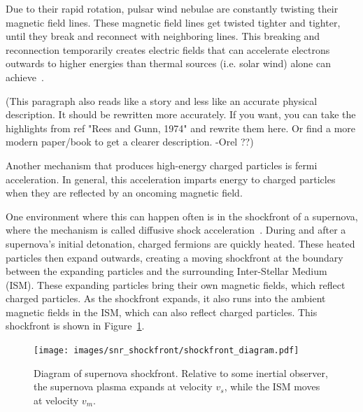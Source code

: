   \FloatBarrier
  
  
  Due to their rapid rotation, pulsar wind nebulae are constantly twisting their magnetic field lines.
  These magnetic field lines get twisted tighter and tighter, until they break and reconnect with neighboring lines.
  This breaking and reconnection temporarily creates electric fields that can accelerate electrons outwards to higher energies than thermal sources (i.e. solar wind) alone can achieve~\cite{gamma_pwn1,gamma_pwn2}.

  {\color{red}(This paragraph also reads like a story and less like an accurate physical description. It should be rewritten more accurately. If you want, you can take the highlights from ref "Rees and Gunn, 1974" and rewrite them here. Or find a more modern paper/book to get a clearer description. -Orel ??)}

  Another mechanism that produces high-energy charged particles is fermi acceleration\cite{fermi1949,highenergyelectron_snr}.
  In general, this acceleration imparts energy to charged particles when they are reflected by an oncoming magnetic field.
  
  One environment where this can happen often is in the shockfront of a supernova, where the mechanism is called diffusive shock acceleration~\cite{dsa1,dsa2,dsa3,dsa4,dsa5}.
  During and after a supernova's initial detonation, charged fermions are quickly heated.
  These heated particles then expand outwards, creating a moving shockfront at the boundary between the expanding particles and the surrounding Inter-Stellar Medium (ISM).
  These expanding particles bring their own magnetic fields, which reflect charged particles.
  As the shockfront expands, it also runs into the ambient magnetic fields in the ISM, which can also reflect charged particles.
  This shockfront is shown in Figure~\ref{fig:snr_shockfront}.

  \begin{figure}[ht]
    \centering
    \texttt{[image: images/snr\_shockfront/shockfront\_diagram.pdf]}
    \caption[Supernova Shockfront]{
      Diagram of supernova shockfront.
      Relative to some inertial observer, the supernova plasma expands at velocity $v_s$, while the ISM moves at velocity $v_m$.
    }
    \label{fig:snr_shockfront}
  \end{figure}
  
